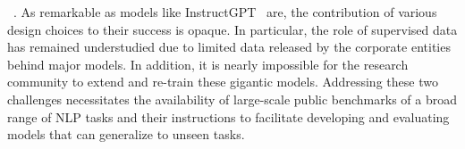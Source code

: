 ~\cite{raffel2020exploring,brown2020language}. As remarkable as models like InstructGPT~\cite{ouyang2022training} are, the contribution of various design choices to their success  is  opaque. In particular, the role of supervised data has remained understudied due to limited data released by the corporate entities behind major models. In addition,  it is nearly impossible for the research community to extend  and re-train these  gigantic models. Addressing these two challenges necessitates the availability of large-scale public benchmarks of a broad range of NLP tasks and their instructions to facilitate developing and evaluating models that can generalize to unseen tasks.

